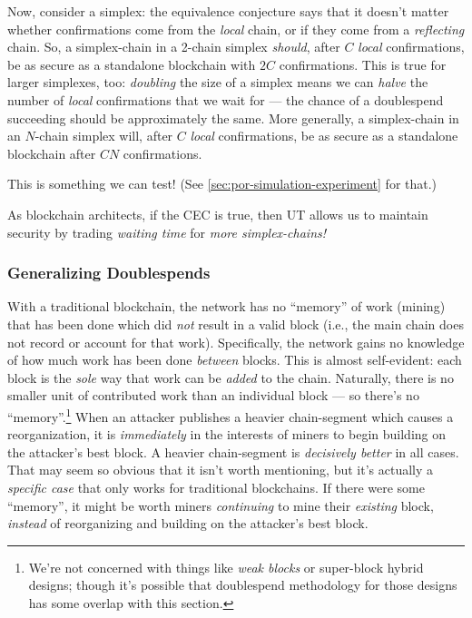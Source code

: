 Now, consider a simplex: the equivalence conjecture says that it doesn't matter whether confirmations come from the \emph{local} chain, or if they come from a \emph{reflecting} chain.
So, a simplex-chain in a 2-chain simplex \emph{should}, after $C$ \emph{local} confirmations, be as secure as a standalone blockchain with $2C$ confirmations.
This is true for larger simplexes, too: \emph{doubling} the size of a simplex means we can \emph{halve} the number of \emph{local} confirmations that we wait for --- the chance of a doublespend succeeding should be approximately the same.
More generally, a simplex-chain in an $N$-chain simplex will, after $C$ \emph{local} confirmations, be as secure as a standalone blockchain after $CN$ confirmations.

This is something we can test!
(See \autoref{sec:por-simulation-experiment} for that.)

As blockchain architects, if the CEC is true, then UT allows us to maintain security by trading \emph{waiting time} for \emph{more simplex-chains!}


\subsubsection{Generalizing Doublespends}

\label{sec:cec-draft-refl-work}

With a traditional blockchain, the network has no ``memory'' of work (mining) that has been done which did \emph{not} result in a valid block (i.e., the main chain does not record or account for that work).
Specifically, the network gains no knowledge of how much work has been done \emph{between} blocks.
This is almost self-evident: each block is the \emph{sole} way that work can be \emph{added} to the chain.
Naturally, there is no smaller unit of contributed work than an individual block --- so there's no ``memory''.\footnote{
    We're not concerned with things like \emph{weak blocks} or super-block hybrid designs; though it's possible that doublespend methodology for those designs has some overlap with this section.
}
When an attacker publishes a heavier chain-segment which causes a reorganization, it is \emph{immediately} in the interests of miners to begin building on the attacker's best block.
A heavier chain-segment is \emph{decisively better} in all cases.
That may seem so obvious that it isn't worth mentioning, but it's actually a \emph{specific case} that only works for traditional blockchains.
If there were some ``memory'', it might be worth miners \emph{continuing} to mine their \emph{existing} block, \emph{instead} of reorganizing and building on the attacker's best block.

